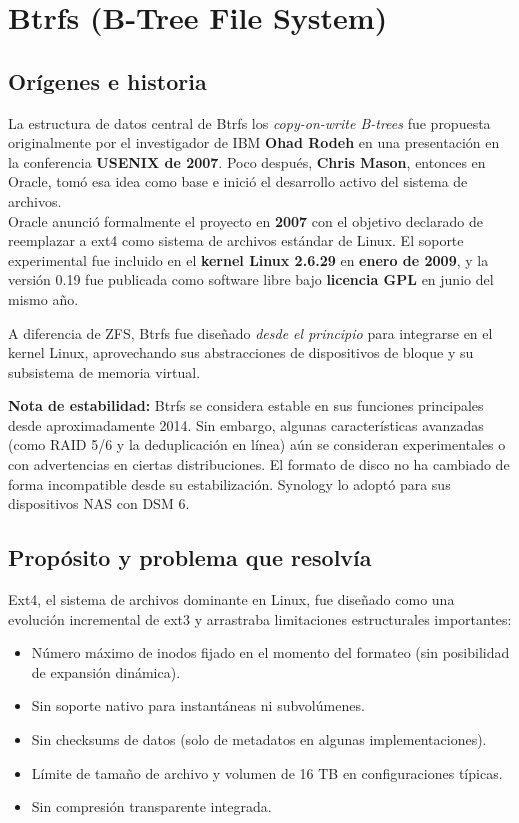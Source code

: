 \documentclass[12pt,letterpaper]{article}
\begin{document}
\newpage

\section{Btrfs (B-Tree File System)}

\subsection{Orígenes e historia}
La estructura de datos central de Btrfs los \emph{copy-on-write B-trees} fue propuesta originalmente por el
investigador de IBM \textbf{Ohad Rodeh} en una presentación en la conferencia \textbf{USENIX de 2007}. Poco
después, \textbf{Chris Mason}, entonces en Oracle, tomó esa idea como base e inició el desarrollo activo del
sistema de archivos.\\

Oracle anunció formalmente el proyecto en \textbf{2007} con el objetivo declarado de reemplazar a ext4 como
sistema de archivos estándar de Linux. El soporte experimental fue incluido en el \textbf{kernel Linux 2.6.29}
en \textbf{enero de 2009}, y la versión 0.19 fue publicada como software libre bajo \textbf{licencia GPL} en
junio del mismo año.

A diferencia de ZFS, Btrfs fue diseñado \emph{desde el principio} para integrarse en el kernel Linux,
aprovechando sus abstracciones de dispositivos de bloque y su subsistema de memoria virtual.

\begin{mdframed}[backgroundcolor=verdefondo, linecolor=verde, linewidth=1pt, roundcorner=4pt]
  \textbf{Nota de estabilidad:} Btrfs se considera estable en sus funciones principales desde aproximadamente
  2014. Sin embargo, algunas características avanzadas (como RAID 5/6 y la deduplicación en línea) aún se
  consideran experimentales o con advertencias en ciertas distribuciones. El formato de disco no ha cambiado de
  forma incompatible desde su estabilización. Synology lo adoptó para sus dispositivos NAS con DSM 6.
\end{mdframed}

\subsection{Propósito y problema que resolvía}
Ext4, el sistema de archivos dominante en Linux, fue diseñado como una evolución incremental de ext3 y arrastraba
limitaciones estructurales importantes:

\begin{itemize}
\item Número máximo de inodos fijado en el momento del formateo (sin posibilidad de expansión dinámica).
\item Sin soporte nativo para instantáneas ni subvolúmenes.
\item Sin checksums de datos (solo de metadatos en algunas implementaciones).
\item Límite de tamaño de archivo y volumen de 16 TB en configuraciones típicas.
\item Sin compresión transparente integrada.
\end{itemize}
\end{document}
